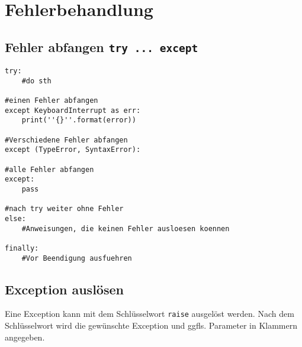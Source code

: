 \chapter{Fehlerbehandlung}
\section{Fehler abfangen \texttt{try ... except}}
\begin{lstlisting}
try:
	#do sth
	
#einen Fehler abfangen
except KeyboardInterrupt as err:
    print(''{}''.format(error))
	
#Verschiedene Fehler abfangen
except (TypeError, SyntaxError):

#alle Fehler abfangen
except:
    pass

#nach try weiter ohne Fehler
else:
    #Anweisungen, die keinen Fehler ausloesen koennen
    
finally:
    #Vor Beendigung ausfuehren
\end{lstlisting}
\section{Exception auslösen}
Eine Exception kann mit dem Schlüsselwort \texttt{raise} ausgelöst werden. Nach dem Schlüsselwort wird die gewünschte Exception und ggfls. Parameter in Klammern angegeben.
